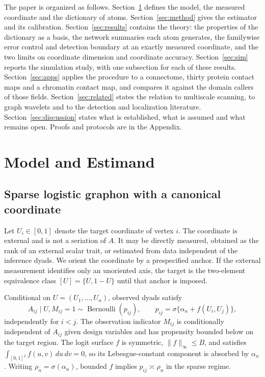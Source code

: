 \documentclass[11pt]{article}
\theoremstyle{definition}
\newcommand{\1}{\mathbf 1}\newcommand{\op}{\operatorname}
\begin{document}
The paper is organized as follows.  Section~\ref{sec:model} defines the model,
the measured coordinate and the dictionary of atoms.  Section~\ref{sec:method}
gives the estimator and its calibration.  Section~\ref{sec:results} contains
the theory: the properties of the dictionary as a basis, the network summaries
each atom generates, the familywise error control and detection boundary at an
exactly measured coordinate, and the two limits on coordinate dimension and
coordinate accuracy.  Section~\ref{sec:sim} reports the simulation study, with
one subsection for each of these results.  Section~\ref{sec:apps} applies the
procedure to a connectome, thirty protein contact maps and a chromatin contact
map, and compares it against the domain callers of those fields.
Section~\ref{sec:related} states the relation to multiscale scanning, to graph
wavelets and to the detection and localization literature.
Section~\ref{sec:discussion} states what is established, what is assumed and
what remains open.  Proofs and protocols are in the Appendix.


\section{Model and Estimand}                              \label{sec:model}

\subsection{Sparse logistic graphon with a canonical coordinate}

Let $U_i\in[0,1]$ denote the target coordinate of vertex $i$.  The coordinate is external and is not a seriation of $A$.  It may be directly measured, obtained as the rank of an external scalar trait, or estimated from data independent of the inference dyads.  We orient the coordinate by a prespecified anchor.  If the external measurement identifies only an unoriented axis, the target is the two-element equivalence class $[U]=\{U,1-U\}$ until that anchor is imposed.

Conditional on $U=(U_1,\ldots,U_n)$, observed dyads satisfy
\begin{equation}
 A_{ij}\mid U,M_{ij}=1\sim\op{Bernoulli}(p_{ij}),\qquad
 p_{ij}=\sigma\{\alpha_n+f(U_i,U_j)\},                       \label{eq:model}
\end{equation}
independently for $i<j$.  The observation indicator $M_{ij}$ is conditionally
independent of $A_{ij}$ given design variables and has propensity bounded below on
the target region.  The logit surface $f$ is symmetric, $\|f\|_\infty\le B$, and
satisfies $\int_{[0,1]^2}f(u,v)\,du\,dv=0$, so its Lebesgue-constant component is
absorbed by $\alpha_n$.  Writing $\rho_n=\sigma(\alpha_n)$, bounded $f$ implies
$p_{ij}\asymp\rho_n$ in the sparse regime.
\end{document}
